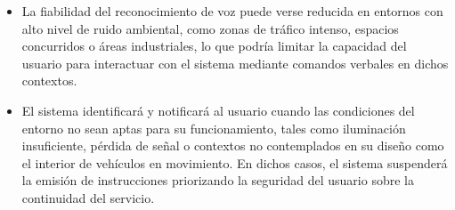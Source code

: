 \begin{itemize}
    \item La fiabilidad del reconocimiento de voz puede verse reducida en entornos con alto nivel de ruido ambiental, como zonas de tráfico intenso, espacios concurridos o áreas industriales, lo que podría limitar la capacidad del usuario para interactuar con el sistema mediante comandos verbales en dichos contextos.
    \item El sistema identificará y notificará al usuario cuando las condiciones del entorno no sean aptas para su funcionamiento, tales como iluminación insuficiente, pérdida de señal o contextos no contemplados en su diseño como el interior de vehículos en movimiento. En dichos casos, el sistema suspenderá la emisión de instrucciones priorizando la seguridad del usuario sobre la continuidad del servicio. 
\end{itemize}